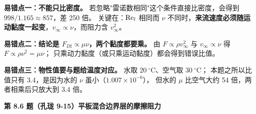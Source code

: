 \begin{yicuo}
\textbf{易错点一：不能只比密度。}
若忽略"雷诺数相同"这个条件直接比密度，会得到 $998/1.165\approx857$，差 250 倍。
关键在：$\mathrm{Re}_l$ 相同而 $\nu$ 不同时，\textbf{来流速度必须随运动黏度一起变}，$v_\infty\propto\nu$，而阻力含 $v_\infty^{2}$。

\textbf{易错点二：结论是 $F_{D\mathrm{f}}\propto\mu\nu$，两个黏度都要乘。}
由 $F\propto\rho v_\infty^{2}$ 与 $v_\infty\propto\nu$ 得 $F\propto\rho\nu^{2}=\mu\nu$；
只乘动力黏度（或只乘运动黏度）都会得到错误比值。

\textbf{易错点三：物性值要与题给温度对应。}
水取 $20\ ^{\circ}\mathrm{C}$、空气取 $30\ ^{\circ}\mathrm{C}$；
本题之所以比值只有 3.4，是因为水的 $\nu$ 虽小（$1.007\times10^{-6}$），
但水的 $\mu$ 比空气大约 54 倍，两者相乘后只放大到 3.4 倍。
\end{yicuo}

\noindent\textbf{第 8.6 题（孔珑 9-15）\quad 平板混合边界层的摩擦阻力}

